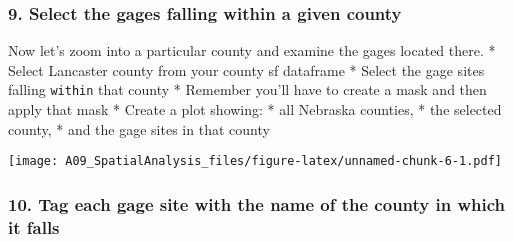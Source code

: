 \documentclass[]{article}
\newenvironment{Shaded}{\begin{snugshade}}{\end{snugshade}}
\newcommand{\KeywordTok}[1]{\textcolor[rgb]{0.13,0.29,0.53}{\textbf{#1}}}
\newcommand{\DataTypeTok}[1]{\textcolor[rgb]{0.13,0.29,0.53}{#1}}
\newcommand{\FloatTok}[1]{\textcolor[rgb]{0.00,0.00,0.81}{#1}}
\newcommand{\StringTok}[1]{\textcolor[rgb]{0.31,0.60,0.02}{#1}}
\newcommand{\CommentTok}[1]{\textcolor[rgb]{0.56,0.35,0.01}{\textit{#1}}}
\newcommand{\OtherTok}[1]{\textcolor[rgb]{0.56,0.35,0.01}{#1}}
\newcommand{\OperatorTok}[1]{\textcolor[rgb]{0.81,0.36,0.00}{\textbf{#1}}}
\newcommand{\NormalTok}[1]{#1}
\begin{document}
\subsubsection{9. Select the gages falling within a given
county}\label{select-the-gages-falling-within-a-given-county}

Now let's zoom into a particular county and examine the gages located
there. * Select Lancaster county from your county sf dataframe * Select
the gage sites falling \texttt{within} that county * Remember you'll
have to create a mask and then apply that mask * Create a plot showing:
* all Nebraska counties, * the selected county, * and the gage sites in
that county

\begin{Shaded}
\end{Shaded}

\texttt{[image: A09\_SpatialAnalysis\_files/figure-latex/unnamed-chunk-6-1.pdf]}

\subsubsection{10. Tag each gage site with the name of the county in
which it
falls}\label{tag-each-gage-site-with-the-name-of-the-county-in-which-it-falls}
\end{document}
